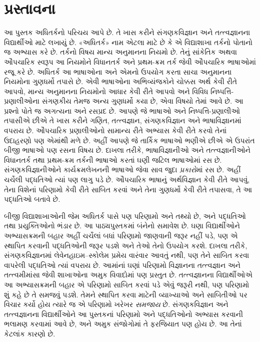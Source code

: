 \chapter{પ્રસ્તાવના}

આ પુસ્તક અધિતર્કનો પરિચય આપે છે. તે ખાસ કરીને સંગણકવિજ્ઞાન અને
તત્ત્વજ્ઞાનના વિદ્યાર્થીઓ માટે લખાયું છે. «અધિતર્ક» નામ એટલા માટે છે
કે એ વિદ્યાશાખા તર્કનો પોતાનો જ અભ્યાસ કરે છે. તર્કનો વિષય માન્ય
અનુમાનના નિયમો છે. તેનું સાંકેતિક અથવા ઔપચારિક સ્વરૂપ આ નિયમોને
વિધાનતર્ક અને પ્રથમ-ક્રમ તર્ક જેવી ઔપચારિક ભાષાઓમાં રજૂ કરે છે. અધિતર્ક
આ ભાષાઓના અને એમનો ઉપયોગ કરતા સાચા અનુમાનના નિયમોના ગુણધર્મો તપાસે છે.
એવી ભાષાઓના અભિવ્યંજકોને ચોક્કસ અર્થ કેવી રીતે આપવો, માન્ય અનુમાનના
નિયમોનો આધાર કેવી રીતે આપવો અને વિવિધ નિષ્પત્તિ-પ્રણાલીઓના સંગણકીય
તેમજ અન્ય ગુણધર્મો કયા છે, એવા વિષયો તેમાં આવે છે. આ પ્રશ્નો પોતે જ
અગત્યના અને રસપ્રદ છે. આપણે જે ભાષાઓ અને નિષ્પત્તિ-પ્રણાલીઓ તપાસીએ
છીએ તે ખાસ કરીને ગણિત, તત્ત્વજ્ઞાન, સંગણકવિજ્ઞાન અને ભાષાવિજ્ઞાનમાં
વપરાય છે. ઔપચારિક પ્રણાલીઓનો સામાન્ય રીતે અભ્યાસ કેવી રીતે કરવો તેનાં
ઉદાહરણો પણ એમાંથી મળે છે. અહીં આપણે જે તાર્કિક ભાષાઓ ભણીએ છીએ એ ઉપરાંત
બીજી ભાષાઓ પણ રસના વિષય છે. દાખલા તરીકે, ભાષાવિજ્ઞાનીઓ અને
તત્ત્વજ્ઞાનીઓને વિધાનતર્ક તથા પ્રથમ-ક્રમ તર્કની ભાષાઓ કરતાં ઘણી જટિલ
ભાષાઓમાં રસ છે. સંગણકવિજ્ઞાનીઓને કાર્યક્રમલેખનની ભાષાઓ જેવા સાવ જુદા
\emph{પ્રકારો}માં રસ છે. અહીં ચર્ચેલી પદ્ધતિઓ ત્યાં પણ લાગુ પડે છે.
ઔપચારિક ભાષાનું અર્થવિજ્ઞાન કેવી રીતે આપવું, તેના વિશેનાં પરિણામો કેવી
રીતે સાબિત કરવાં અને તેના ગુણધર્મો કેવી રીતે તપાસવા, તે આ પદ્ધતિઓ
બતાવે છે.

બીજી વિદ્યાશાખાઓની જેમ અધિતર્ક પાસે પણ પરિણામો અને તથ્યો છે, અને
પદ્ધતિઓ તથા પ્રયુક્તિઓનો ભંડાર છે. આ પાઠ્યપુસ્તકમાં બંનેનો સમાવેશ છે.
ઘણા વિદ્યાર્થીઓને અભ્યાસક્રમની બહાર અહીં ચર્ચેલાં બધાં પરિણામો જાણવાની
જરૂર નહીં પડે, પણ એ સ્થાપિત કરવાની પદ્ધતિઓની જરૂર પડશે અને તેઓ તેનો
ઉપયોગ કરશે. દાખલા તરીકે, સંગણકવિજ્ઞાનમાં લેવેનહાઇમ--સ્કોલેમ પ્રમેય
વારંવાર આવતું નથી, પણ તેને સાબિત કરવા વાપરેલી પદ્ધતિઓ ત્યાં વપરાય છે.
આમાંનાં ઘણાં પરિણામો વિજ્ઞાનના તત્ત્વજ્ઞાન અને તત્ત્વમીમાંસા જેવી
શાખાઓના અમુક વિવાદોમાં પણ પ્રસ્તુત છે. તત્ત્વજ્ઞાનના વિદ્યાર્થીઓએ આ
અભ્યાસક્રમની બહાર એ પરિણામો સાબિત કરવાં પડે એવું જરૂરી નથી, પણ
પરિણામો શું કહે છે તે સમજવું પડશે. તેમને સ્થાપિત કરવા માટેની વ્યાખ્યાઓ
અને સાબિતીઓ પર વિચાર કર્યો હોય ત્યારે જ એ પરિણામો ખરેખર \emph{સમજાય}
છે. સંગણકવિજ્ઞાન અને તત્ત્વજ્ઞાનના વિદ્યાર્થીઓને આ પુસ્તકનાં પરિણામો અને
પદ્ધતિઓનો અભ્યાસ કરવાની ભલામણ કરવામાં આવે છે, અને અમુક સંજોગોમાં તે
ફરજિયાત પણ હોય છે. આ તેનાં કેટલાંક કારણો છે.

